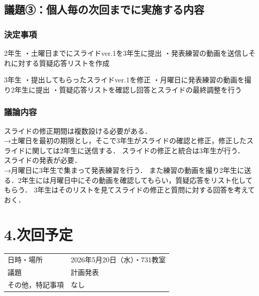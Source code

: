 \documentclass[a4paper,12pt]{ltjsarticle}
\begin{document}
\subsection*{議題③：個人毎の次回までに実施する内容}

\subsubsection*{決定事項}
2年生
・土曜日までにスライドver.1を3年生に提出
・発表練習の動画を送信しそれに対する質疑応答リストを作成

3年生
・提出してもらったスライドver.1を修正
・月曜日に発表練習の動画を撮り2年生に提出
・質疑応答リストを確認し回答とスライドの最終調整を行う

\subsubsection*{議論内容}
スライドの修正期間は複数設ける必要がある．\\
→土曜日を最初の期限とし，そこで3年生がスライドの確認と修正，修正したスライドに関しては2年生に送信する．
スライドの修正と統合は3年生が行う．\\
スライドの発表が必要．\\
→月曜日に3年生で集まって発表練習を行う．
また練習の動画を撮り2年生に送る．2年生には月曜日中にその動画を確認してもらい，質疑応答をリスト化してもらう．
3年生はそのリストを見てスライドの修正と質問に対する回答を考えておく．

\section*{4.次回予定}
\begin{tabular}{ll}
  \toprule
  日時・場所 & 2026年5月20日（水）・731教室 \\
  議題       &  計画発表 \\
  その他，特記事項 & なし \\
  \bottomrule
\end{tabular}
\end{document}
